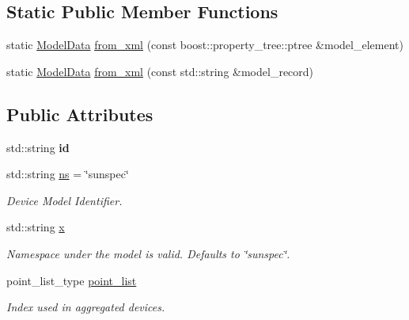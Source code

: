 \subsection*{Static Public Member Functions}
\begin{DoxyCompactItemize}
\item 
static \hyperlink{structsunspec_1_1data_1_1_model_data}{Model\+Data} \hyperlink{structsunspec_1_1data_1_1_model_data_a8a57a3b29c57f7340ce3c89da6764e78}{from\+\_\+xml} (const boost\+::property\+\_\+tree\+::ptree \&model\+\_\+element)
\item 
static \hyperlink{structsunspec_1_1data_1_1_model_data}{Model\+Data} \hyperlink{structsunspec_1_1data_1_1_model_data_a641f3aa787ba842f6a7b782af694de63}{from\+\_\+xml} (const std\+::string \&model\+\_\+record)
\end{DoxyCompactItemize}
\subsection*{Public Attributes}
\begin{DoxyCompactItemize}
\item 
\mbox{\label{structsunspec_1_1data_1_1_model_data_a00873d1b556672e43f44c85344f7a30b}} 
std\+::string {\bfseries id}
\item 
\mbox{\label{structsunspec_1_1data_1_1_model_data_a54021b21444d4966e6d2fdceb67f95c8}} 
std\+::string \hyperlink{structsunspec_1_1data_1_1_model_data_a54021b21444d4966e6d2fdceb67f95c8}{ns} = \char`\"{}sunspec\char`\"{}
\begin{DoxyCompactList}\small\item\em Device Model Identifier. \end{DoxyCompactList}\item 
\mbox{\label{structsunspec_1_1data_1_1_model_data_aee92cb69fbb04a963237f171571e806c}} 
std\+::string \hyperlink{structsunspec_1_1data_1_1_model_data_aee92cb69fbb04a963237f171571e806c}{x}
\begin{DoxyCompactList}\small\item\em Namespace under the model is valid. Defaults to {\ttfamily \char`\"{}sunspec\char`\"{}}. \end{DoxyCompactList}\item 
\mbox{\label{structsunspec_1_1data_1_1_model_data_a15540f6f5da7d0f4c142b1ef57f02bf8}} 
point\+\_\+list\+\_\+type \hyperlink{structsunspec_1_1data_1_1_model_data_a15540f6f5da7d0f4c142b1ef57f02bf8}{point\+\_\+list}
\begin{DoxyCompactList}\small\item\em Index used in aggregated devices. \end{DoxyCompactList}\end{DoxyCompactItemize}


